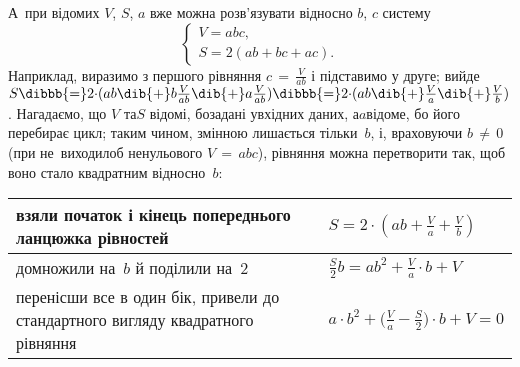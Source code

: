 А~при відомих $V$, $S$, $a$ вже можна розв'язувати відносно $b$, $c$ систему 
$$
\left\{
\begin{array}{l}
V = abc, \\
S = 2(ab+bc+ac).
\end{array}
\right.
$$
Наприклад, виразимо з першого рівняння ${c\,{=}\,\frac{V}{ab}}$ і підставимо у друге; вийде
$S \dibbb{{=}} 2{\cdot}(ab\dib{{+}}b\frac{V}{ab}\dib{{+}}a\frac{V}{ab}) \dibbb{{=}}
2{\cdot}(ab\dib{{+}}\frac{V}{a}\dib{{+}}\frac{V}{b})$. Нагадаємо, що $V$ та\nolinebreak[3] $S$ відомі, бо\nolinebreak[2] задані у\nolinebreak[2] вхідних даних, а\nolinebreak[2] $a$\nolinebreak[2] відоме, бо його перебирає цикл; таким чином, змінною лишається тільки~$b$, і, враховуючи $b\,{\neq}\,0$ (при не~виходило\nolinebreak[3] б ненульового $V\,{=}\,abc$), рівняння можна перетворити так, щоб воно стало квадратним відносно~$b$:


\begin{longtable}{@{}p{}|l@{}}
взяли початок і кінець попереднього ланцюжка рівностей
&
$S=2\cdot(ab+\frac{V}{a}+\frac{V}{b})$\vphantom{$\displaystyle\frac{(a)}{a}$}
\\\hline
домножили на~$b$ й поділили на~2
&
$\frac{S}{2}b = ab^2 + \frac{V}{a}\cdot b + V$\vphantom{$\displaystyle\frac{(a)}{a}$}
\\\hline
перенісши все в один бік, привели до стан\-дарт\-ного вигляду квадратного рівняння
&
$a\cdot b^2 + \bigl(\frac{V}{a}-\frac{S}{2}\bigr)\cdot b + V = 0$\vphantom{$\displaystyle\frac{(a)}{a}$}
\end{longtable}





